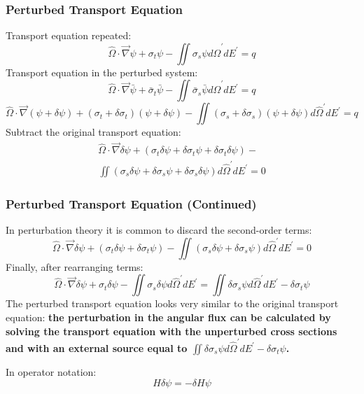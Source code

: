 \documentclass[t]{beamer}
\begin{document}
\begin{frame}
  \frametitle{Perturbed Transport Equation}
  Transport equation repeated:
  \begin{equation*}
    \hat{\Omega}\cdot\vec{\nabla}\psi +
    \sigma_t\psi -
    \iint\sigma_s\psi d\hat{\Omega}^\prime dE^\prime =
    q
  \end{equation*}
  Transport equation in the perturbed system:
  \begin{equation}
    \hat{\Omega}\cdot\vec{\nabla}\bar{\psi} +
    \bar{\sigma}_t\bar{\psi} -
    \iint\bar{\sigma}_s\bar{\psi} d\hat{\Omega}^\prime dE^\prime =
    q
  \end{equation}
  \begin{equation}
    \hat{\Omega}\cdot\vec{\nabla}\left(\psi + \delta\psi\right) +
    \left(\sigma_t + \delta\sigma_t\right)\left(\psi + \delta\psi\right) -
    \iint\left(\sigma_s + \delta\sigma_s\right)\left(\psi + \delta\psi\right)d\hat{\Omega}^\prime dE^\prime =
    q
  \end{equation}
  Subtract the original transport equation:
  \begin{multline}
    \hat{\Omega}\cdot\vec{\nabla}\delta\psi +
    \left(\sigma_t\delta\psi + \delta\sigma_t\psi + \delta\sigma_t\delta\psi\right) - \\
    \iint\left(\sigma_s\delta\psi + \delta\sigma_s\psi + \delta\sigma_s\delta\psi\right)d\hat{\Omega}^\prime dE^\prime =
    0
  \end{multline}
\end{frame}

\begin{frame}
  \frametitle{Perturbed Transport Equation (Continued)}
  In perturbation theory it is common to discard the second-order terms:
  \begin{equation}
    \hat{\Omega}\cdot\vec{\nabla}\delta\psi +
    \left(\sigma_t\delta\psi + \delta\sigma_t\psi\right) -
    \iint\left(\sigma_s\delta\psi + \delta\sigma_s\psi\right)d\hat{\Omega}^\prime dE^\prime =
    0
  \end{equation}
  Finally, after rearranging terms:
  \begin{equation}
    \hat{\Omega}\cdot\vec{\nabla}\delta\psi +
    \sigma_t\delta\psi -
    \iint\sigma_s\delta\psi d\hat{\Omega}^\prime dE^\prime =
    \iint\delta\sigma_s\psi d\hat{\Omega}^\prime dE^\prime - \delta\sigma_t\psi
  \end{equation}
  The perturbed transport equation looks very similar to the original transport
  equation: \textbf{the perturbation in the angular flux can be calculated by
  solving the transport equation with the unperturbed cross sections and with an
  external source equal to
  $\iint\delta\sigma_s\psi d\hat{\Omega}^\prime dE^\prime - \delta\sigma_t\psi$.}

  In operator notation:
  \begin{equation}
    H\delta\psi = -\delta H\psi
  \end{equation}
\end{frame}
\end{document}
